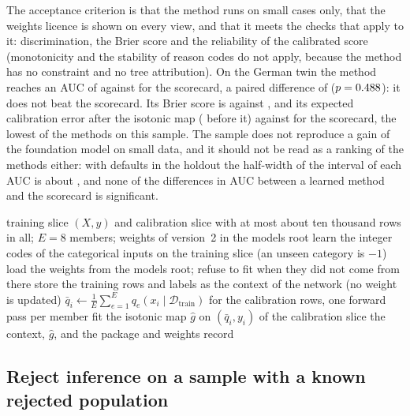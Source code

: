 The acceptance criterion is that the method runs on small cases only, that the weights licence is shown on every view, and that
it meets the checks that apply to it: discrimination, the Brier score and the reliability of the calibrated score (monotonicity
and the stability of reason codes do not apply, because the method has no constraint and no tree attribution). On the German twin the method reaches an AUC of \csGtTpAuc{} against \csGtScAuc{}
for the scorecard, a paired difference of \csGtTpDlDiff{} ($p=0.488{}$): it does not beat the scorecard. Its Brier score is
\csGtTpBrier{} against \csGtScBrier{}, and its expected calibration error \csGtTpEce{} after the isotonic map (\csGtEceTpRaw{} before it) against \csGtScEce{} for the scorecard, the lowest of the
methods on this sample. The sample does not reproduce a gain of the foundation model on small data, and it should not be read as a
ranking of the methods either: with \csGtEvents{} defaults in the holdout the half-width of the interval of each AUC is about
\csGtScHalf{}, and none of the differences in AUC between a learned method and the scorecard is significant.

\begin{algorithm}[htbp]
\caption{Fit of the TabPFN challenger and its isotonic map on a small sample}
\label{alg:cs-tabpfn}
\begin{algorithmic}[1]
\Require training slice $(X,y)$ and calibration slice with at most about ten thousand rows in all; $E=8$ members; weights of version~2 in the models root
\State learn the integer codes of the categorical inputs on the training slice (an unseen category is $-1$)
\State load the weights from the models root; refuse to fit when they did not come from there
\State store the training rows and labels as the context of the network (no weight is updated)
\State $\bar q_i\gets\frac1E\sum_{e=1}^{E}q_e(x_i\mid\mathcal{D}_{\mathrm{train}})$ for the calibration rows, one forward pass per member
\State fit the isotonic map $\hat g$ on $(\bar q_i,y_i)$ of the calibration slice
\State \Return the context, $\hat g$, and the package and weights record
\end{algorithmic}
\end{algorithm}

\subsection{Reject inference on a sample with a known rejected population}
\label{sec:m35}

